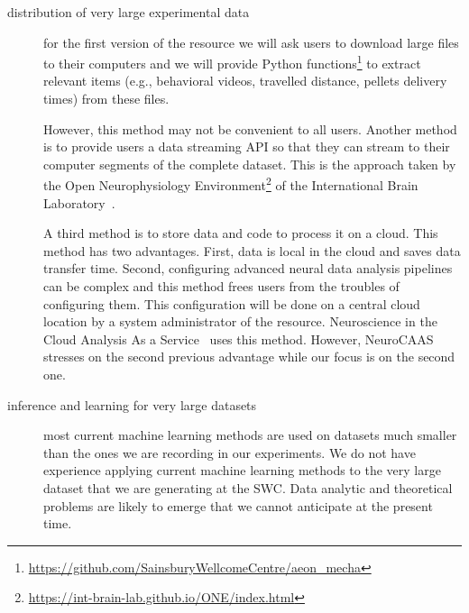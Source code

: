 \begin{description}

    \item[distribution of very large experimental data] for the first version
        of the resource we will ask users to download large files to their
        computers and we will provide Python
        functions\footnote{\url{https://github.com/SainsburyWellcomeCentre/aeon\_mecha}}
        to extract relevant items (e.g., behavioral videos, travelled distance,
        pellets delivery times) from these files.

        However, this method may not be convenient to all users. Another method
        is to provide users a data streaming API so that they can stream to
        their computer segments of the complete dataset. This is the approach
        taken by the Open Neurophysiology
        Environment\footnote{\url{https://int-brain-lab.github.io/ONE/index.html}}
        of the International Brain Laboratory~\citep{bonacchiEtAl23}.

		A third method is to store data and code to process it on a cloud.
		This method has two advantages. First, data is local in the cloud and
		saves data transfer time. Second, configuring advanced neural data
		analysis pipelines can be complex and this method frees users from the
		troubles of configuring them. This configuration will be done on a
		central cloud location by a system administrator of the resource.
		Neuroscience in the Cloud Analysis As a
		Service~\citep[NeuroCASS][]{abeEtAl22} uses this method. However,
		NeuroCAAS stresses on the second previous advantage while our focus is
		on the second one.

	\item[inference and learning for very large datasets] most current machine
	learning methods are used on datasets much smaller than the ones we are
	recording in our experiments. We do not have experience applying current
	machine learning methods to the very large dataset that we are generating
	at the SWC. Data analytic and theoretical problems are likely to emerge
	that we cannot anticipate at the present time.


\end{description}
